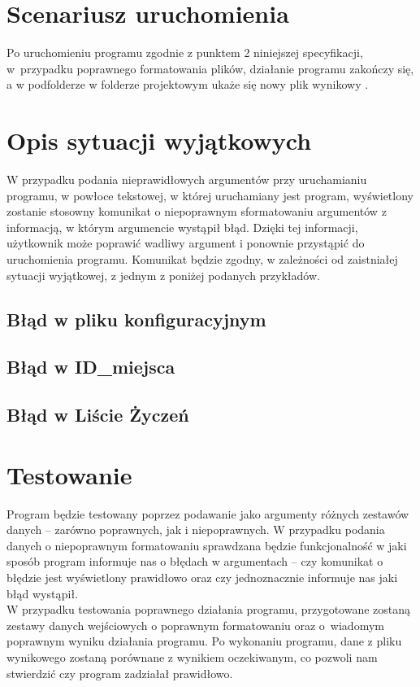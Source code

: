 \documentclass[12pt,a4paper]{article}
\begin{document}
\section{Scenariusz uruchomienia}
Po uruchomieniu programu zgodnie z punktem 2 niniejszej specyfikacji, w~przypadku poprawnego formatowania plików, działanie programu zakończy się, a w podfolderze  w folderze projektowym ukaże się nowy plik wynikowy .
\section{Opis sytuacji wyjątkowych}
W przypadku podania nieprawidłowych argumentów przy uruchamianiu programu, w powłoce tekstowej, w której uruchamiany jest program, wyświetlony zostanie stosowny komunikat o niepoprawnym sformatowaniu argumentów z informacją, w którym argumencie wystąpił błąd. Dzięki tej informacji, użytkownik może poprawić wadliwy argument i ponownie przystąpić do uruchomienia programu. Komunikat będzie zgodny, w zależności od zaistniałej sytuacji wyjątkowej, z jednym z poniżej podanych przykładów.
\subsection{Błąd w pliku konfiguracyjnym}
\subsection{Błąd w ID\_miejsca}
\subsection{Błąd w Liście Życzeń }
\section{Testowanie}
Program będzie testowany poprzez podawanie jako argumenty różnych zestawów danych -- zarówno poprawnych, jak i niepoprawnych. W przypadku podania danych o niepoprawnym formatowaniu sprawdzana będzie funkcjonalność w jaki sposób program informuje nas o błędach w argumentach -- czy komunikat o błędzie jest wyświetlony prawidłowo oraz czy jednoznacznie informuje nas jaki błąd wystąpił.\\
\indent W przypadku testowania poprawnego działania programu, przygotowane zostaną zestawy danych wejściowych o poprawnym formatowaniu oraz o~wiadomym poprawnym wyniku działania programu. Po wykonaniu programu, dane z pliku wynikowego zostaną porównane z wynikiem oczekiwanym, co pozwoli nam stwierdzić czy program zadziałał prawidłowo.
\end{document}

